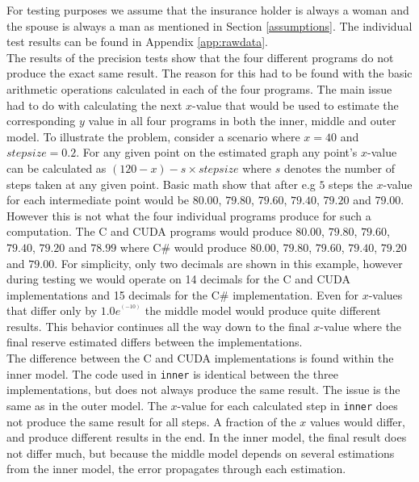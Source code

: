 For testing purposes we assume that the insurance holder is always a woman and the spouse is always a man as mentioned in Section \ref{assumptions}. The individual test results can be found in Appendix \ref{app:rawdata}.\\

The results of the precision tests show that the four different programs do not produce the exact same result. The reason for this had to be found with the basic arithmetic operations calculated in each of the four programs. The main issue had to do with calculating the next $x$-value that would be used to estimate the corresponding $y$ value in all four programs in both the inner, middle and outer model. To illustrate the problem, consider a scenario where $x = 40$ and $stepsize = 0.2$. For any given point on the estimated graph any point's $x$-value can be calculated as $(120-x)-s \times stepsize$ where $s$ denotes the number of steps taken at any given point. Basic math show that after e.g $5$ steps the $x$-value for each intermediate point would be $80.00$, $79.80$, $79.60$, $79.40$, $79.20$ and $79.00$. However this is not what the four individual programs produce for such a computation. The C and CUDA programs would produce $80.00$, $79.80$, $79.60$, $79.40$, $79.20$ and $78.99$ where C\# would produce $80.00$, $79.80$, $79.60$, $79.40$, $79.20$ and $79.00$. For simplicity, only two decimals are shown in this example, however during testing we would operate on 14 decimals for the C and CUDA implementations and 15 decimals for the C\# implementation. Even for $x$-values that differ only by $1.0e^^(-10)$ the middle model would produce quite different results. This behavior continues all the way down to the final $x$-value where the final reserve estimated differs between the implementations.\\

The difference between the C and CUDA implementations is found within the inner model. The code used in \texttt{inner} is identical between the three implementations, but does not always produce the same result. The issue is the same as in the outer model. The $x$-value for each calculated step in \texttt{inner} does not produce the same result for all steps. A fraction of the $x$ values would differ, and produce different results in the end. In the inner model, the final result does not differ much, but because the middle model depends on several estimations from the inner model, the error propagates through each estimation.\\

